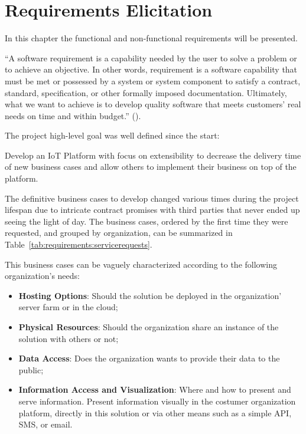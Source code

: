 \chapter{Requirements Elicitation}
\label{chap:requirements}

In this chapter the functional and non-functional requirements will be presented.

``A software requirement is a capability needed by the user to solve a problem or to achieve an objective. In other words, requirement is a software capability that must be met or possessed by a system or system component to satisfy a contract, standard, specification, or other formally imposed documentation. Ultimately, what we want to achieve is to develop quality software that meets customers' real needs on time and within budget.'' (\cite{req}).

The project high-level goal was well defined since the start:

Develop an IoT Platform with focus on extensibility to decrease the delivery time of new business cases and allow others to implement their business on top of the platform.

The definitive business cases to develop changed various times during the project lifespan due to intricate contract promises with third parties that never ended up seeing the light of day. The business cases, ordered by the first time they were requested, and grouped by organization, can be summarized in Table~\ref{tab:requirements:servicerequests}.

This business cases can be vaguely characterized according to the following organization's needs:

\begin{itemize}
    \item \textbf{Hosting Options}: Should the solution be deployed in the organization' server farm or in the cloud;
    \item \textbf{Physical Resources}: Should the organization share an instance of the solution with others or not;
    \item \textbf{Data Access}: Does the organization wants to provide their data to the public;
    \item \textbf{Information Access and Visualization}: Where and how to present and serve information. Present information visually in the costumer organization platform, directly in this solution or via other means such as a simple \gls{API}, SMS, or email.
\end{itemize}


